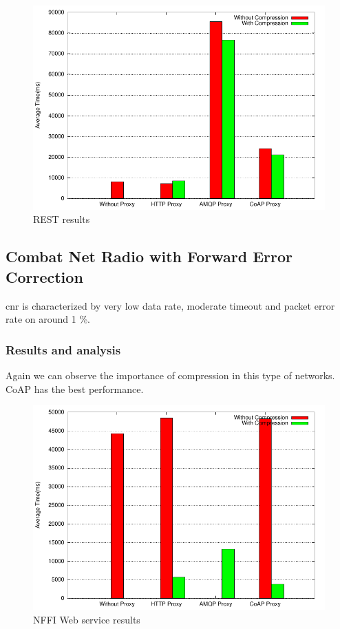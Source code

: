 \begin{figure}[H]
\center
\includegraphics[scale=0.75]{../results/wifi2/rest/result.pdf}
\caption{REST results}
\end{figure}

\subsection{Combat Net Radio with Forward Error Correction}

\gls{cnr} is characterized by very low data rate, moderate timeout and packet
error rate on around 1 \%.


\subsubsection{Results and analysis}

Again we can observe the importance of compression in this type of networks.
CoAP has the best performance.

\begin{figure}[H]
\center
\includegraphics[scale=0.75]{../results/cnr/nffi/result.pdf}
\caption{NFFI Web service results}
\end{figure}

